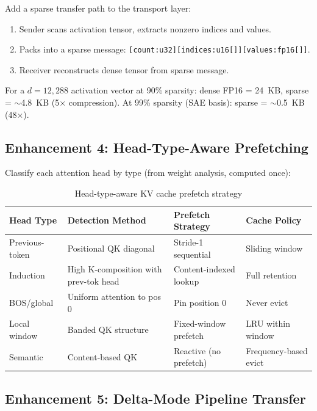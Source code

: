 \documentclass[11pt,letterpaper]{article}
\begin{document}
Add a sparse transfer path to the transport layer:

\begin{enumerate}
    \item Sender scans activation tensor, extracts nonzero indices and values.
    \item Packs into a sparse message: \texttt{[count:u32][indices:u16[]][values:fp16[]]}.
    \item Receiver reconstructs dense tensor from sparse message.
\end{enumerate}

For a $d = 12{,}288$ activation vector at 90\% sparsity: dense FP16 = 24~KB, sparse = $\sim$4.8~KB (5$\times$ compression). At 99\% sparsity (SAE basis): sparse = $\sim$0.5~KB (48$\times$).

\subsection{Enhancement 4: Head-Type-Aware Prefetching}

Classify each attention head by type (from weight analysis, computed once):

\begin{table}[htbp]
\centering
\caption{Head-type-aware KV cache prefetch strategy}
\label{tab:prefetch}
\begin{tabular}{@{}llll@{}}
\toprule
\textbf{Head Type} & \textbf{Detection Method} & \textbf{Prefetch Strategy} & \textbf{Cache Policy} \\
\midrule
Previous-token & Positional QK diagonal & Stride-1 sequential & Sliding window \\
Induction & High K-composition with prev-tok head & Content-indexed lookup & Full retention \\
BOS/global & Uniform attention to pos 0 & Pin position 0 & Never evict \\
Local window & Banded QK structure & Fixed-window prefetch & LRU within window \\
Semantic & Content-based QK & Reactive (no prefetch) & Frequency-based evict \\
\bottomrule
\end{tabular}
\end{table}

\subsection{Enhancement 5: Delta-Mode Pipeline Transfer}
\end{document}

